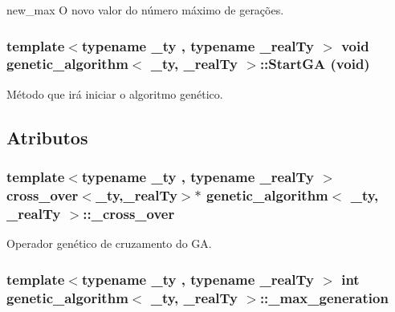 new\_\-max O novo valor do número máximo de gerações. \hypertarget{classgenetic__algorithm_a9a875d5695bfcc574b616f69e1605427}{
\subsubsection[{StartGA}]{\setlength{\rightskip}{0pt plus 5cm}template$<$typename \_\-ty , typename \_\-realTy $>$ void {\bf genetic\_\-algorithm}$<$ \_\-ty, \_\-realTy $>$::StartGA (void)}}
\label{classgenetic__algorithm_a9a875d5695bfcc574b616f69e1605427}
Método que irá iniciar o algoritmo genético. 

\subsection{Atributos}
\hypertarget{classgenetic__algorithm_a4b1145baa8b987a6e69681f79a939b24}{
\subsubsection[{\_\-cross\_\-over}]{\setlength{\rightskip}{0pt plus 5cm}template$<$typename \_\-ty , typename \_\-realTy $>$ {\bf cross\_\-over}$<$\_\-ty,\_\-realTy$>$$\ast$ {\bf genetic\_\-algorithm}$<$ \_\-ty, \_\-realTy $>$::{\bf \_\-cross\_\-over}}}
\label{classgenetic__algorithm_a4b1145baa8b987a6e69681f79a939b24}
Operador genético de cruzamento do GA. \hypertarget{classgenetic__algorithm_aa27789d88ad571a15a9ad984f238f51e}{
\subsubsection[{\_\-max\_\-generation}]{\setlength{\rightskip}{0pt plus 5cm}template$<$typename \_\-ty , typename \_\-realTy $>$ int {\bf genetic\_\-algorithm}$<$ \_\-ty, \_\-realTy $>$::{\bf \_\-max\_\-generation}}}
